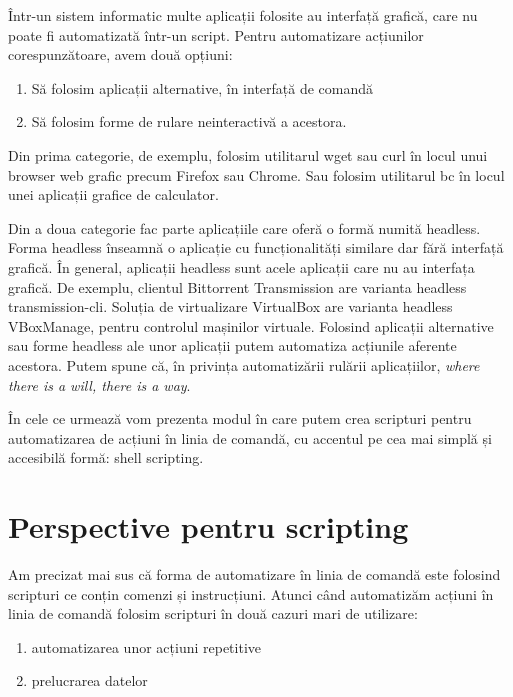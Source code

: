 Într-un sistem informatic multe aplicații folosite au interfață grafică, care nu
poate fi automatizată într-un script. Pentru automatizare acțiunilor
corespunzătoare, avem două opțiuni:

\begin{enumerate}
	\item Să folosim aplicații alternative, în interfață de comandă
	\item Să folosim forme de rulare neinteractivă a acestora.
\end{enumerate}

Din prima categorie, de exemplu, folosim utilitarul wget sau curl în locul unui
browser web grafic precum Firefox sau Chrome. Sau folosim utilitarul bc în locul
unei aplicații grafice de calculator.

Din a doua categorie fac parte aplicațiile care oferă o formă numită headless.
Forma headless înseamnă o aplicație cu funcționalități similare dar fără
interfață grafică. În general, aplicații headless sunt acele aplicații care nu
au interfața grafică. De exemplu, clientul Bittorrent Transmission are varianta
headless transmission-cli. Soluția de virtualizare VirtualBox are varianta
headless VBoxManage, pentru controlul mașinilor virtuale. Folosind aplicații
alternative sau forme headless ale unor aplicații putem automatiza acțiunile
aferente acestora. Putem spune că, în privința automatizării rulării
aplicațiilor, \textit{where there is a will, there is a way}.

În cele ce urmează vom prezenta modul în care putem crea scripturi pentru
automatizarea de acțiuni în linia de comandă, cu accentul pe cea mai simplă și
accesibilă formă: shell scripting.

\section{Perspective pentru scripting}
\label{sec:auto-why}

Am precizat mai sus că forma de automatizare în linia de comandă este folosind
scripturi ce conțin comenzi și instrucțiuni. Atunci când automatizăm acțiuni în
linia de comandă folosim scripturi în două cazuri mari de utilizare:

\begin{enumerate}
	\item automatizarea unor acțiuni repetitive
	\item prelucrarea datelor
\end{enumerate}

